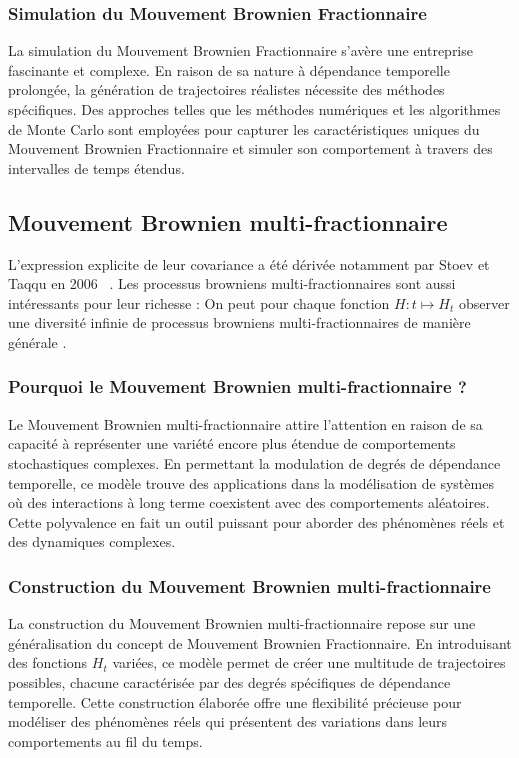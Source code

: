 \subsubsection{Simulation du Mouvement Brownien Fractionnaire}

La simulation du Mouvement Brownien Fractionnaire s'avère une entreprise fascinante et complexe. En raison de sa nature à dépendance temporelle prolongée, la génération de trajectoires réalistes nécessite des méthodes spécifiques. Des approches telles que les méthodes numériques et les algorithmes de Monte Carlo sont employées pour capturer les caractéristiques uniques du Mouvement Brownien Fractionnaire et simuler son comportement à travers des intervalles de temps étendus.

\subsection{Mouvement Brownien multi-fractionnaire}

L'expression explicite de leur covariance a été dérivée notamment par Stoev et Taqqu en 2006 ~\cite{mfbm-howrich}. Les processus browniens multi-fractionnaires sont aussi intéressants pour leur \og richesse \fg : On peut pour chaque fonction $H : t \mapsto H_t$ observer \og une diversité infinie de processus browniens multi-fractionnaires de manière générale \fg.~\cite{mfbm-howrich}

\subsubsection{Pourquoi le Mouvement Brownien multi-fractionnaire ?}

Le Mouvement Brownien multi-fractionnaire attire l'attention en raison de sa capacité à représenter une variété encore plus étendue de comportements stochastiques complexes. En permettant la modulation de degrés de dépendance temporelle, ce modèle trouve des applications dans la modélisation de systèmes où des interactions à long terme coexistent avec des comportements aléatoires. Cette polyvalence en fait un outil puissant pour aborder des phénomènes réels et des dynamiques complexes.

\subsubsection{Construction du Mouvement Brownien multi-fractionnaire}

La construction du Mouvement Brownien multi-fractionnaire repose sur une généralisation du concept de Mouvement Brownien Fractionnaire. En introduisant des fonctions $H_t$ variées, ce modèle permet de créer une multitude de trajectoires possibles, chacune caractérisée par des degrés spécifiques de dépendance temporelle. Cette construction élaborée offre une flexibilité précieuse pour modéliser des phénomènes réels qui présentent des variations dans leurs comportements au fil du temps.


